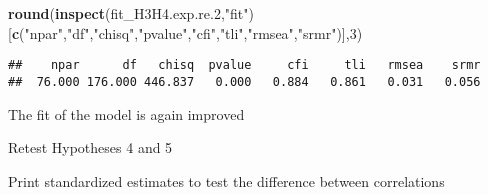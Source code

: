 \documentclass[
]{article}
\newenvironment{Shaded}{\begin{snugshade}}{\end{snugshade}}
\newcommand{\DecValTok}[1]{\textcolor[rgb]{0.00,0.00,0.81}{#1}}
\newcommand{\FloatTok}[1]{\textcolor[rgb]{0.00,0.00,0.81}{#1}}
\newcommand{\KeywordTok}[1]{\textcolor[rgb]{0.13,0.29,0.53}{\textbf{#1}}}
\newcommand{\NormalTok}[1]{#1}
\newcommand{\OperatorTok}[1]{\textcolor[rgb]{0.81,0.36,0.00}{\textbf{#1}}}
\newcommand{\StringTok}[1]{\textcolor[rgb]{0.31,0.60,0.02}{#1}}
\begin{document}
\begin{Shaded}
\begin{Highlighting}[]
\KeywordTok{round}\NormalTok{(}\KeywordTok{inspect}\NormalTok{(fit_H3H4.exp.re}\FloatTok{.2}\NormalTok{,}\StringTok{"fit"}\NormalTok{)}
\NormalTok{      [}\KeywordTok{c}\NormalTok{(}\StringTok{"npar"}\NormalTok{,}\StringTok{"df"}\NormalTok{,}\StringTok{"chisq"}\NormalTok{,}\StringTok{"pvalue"}\NormalTok{,}\StringTok{"cfi"}\NormalTok{,}\StringTok{"tli"}\NormalTok{,}\StringTok{"rmsea"}\NormalTok{,}\StringTok{"srmr"}\NormalTok{)],}\DecValTok{3}\NormalTok{)}
\end{Highlighting}
\end{Shaded}

\begin{verbatim}
##    npar      df   chisq  pvalue     cfi     tli   rmsea    srmr 
##  76.000 176.000 446.837   0.000   0.884   0.861   0.031   0.056
\end{verbatim}

The fit of the model is again improved

Retest Hypotheses 4 and 5

Print standardized estimates to test the difference between correlations

\begin{Shaded}
\end{Shaded}
\end{document}
